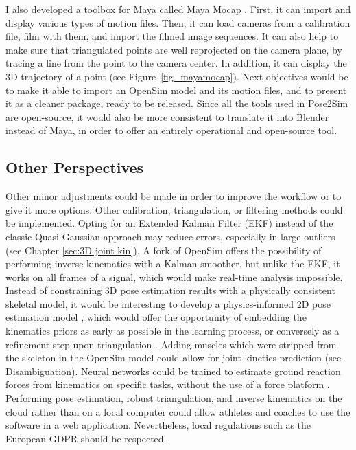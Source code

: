 I also developed a toolbox for Maya \cite{Maya1998} called Maya Mocap \cite{Pagnon2020}. First, it can import and display various types of motion files. Then, it can load cameras from a calibration file, film with them, and import the filmed image sequences. It can also help to make sure that triangulated points are well reprojected on the camera plane, by tracing a line from the point to the camera center. In addition, it can display the 3D trajectory of a point (see Figure~\ref{fig_mayamocap}). Next objectives would be to make it able to import an OpenSim model and its motion files, and to present it as a cleaner package, ready to be released. Since all the tools used in Pose2Sim are open-source, it would also be more consistent to translate it into Blender instead of Maya, in order to offer an entirely operational and open-source tool.


\FloatBarrier
\subsection{Other Perspectives}

Other minor adjustments could be made in order to improve the workflow or to give it more options. Other calibration, triangulation, or filtering methods could be implemented. Opting for an Extended Kalman Filter (EKF) instead of the classic Quasi-Gaussian approach \cite{Rauch1965,Needham2021a} may reduce errors, especially in large outliers (see Chapter \ref{sec:3D joint kin}). A fork of OpenSim offers the possibility of performing inverse kinematics with a Kalman smoother, but unlike the EKF, it works on all frames of a signal, which would make real-time analysis impossible. Instead of constraining 3D pose estimation results with a physically consistent skeletal model, it would be interesting to develop a physics-informed 2D pose estimation model \cite{Raissi2019,Xu2020a}, which would offer the opportunity of embedding the kinematics priors as early as possible in the learning process, or conversely as a refinement step upon triangulation \cite{Hua2022}. Adding muscles which were stripped from the skeleton in the OpenSim model could allow for joint kinetics prediction (see \hyperlink{Ann:gloss}{Disambiguation}). Neural networks could be trained to estimate ground reaction forces from kinematics on specific tasks, without the use of a force platform \cite{Oh2013,Johnson2018,Mundt2019}. Performing pose estimation, robust triangulation, and inverse kinematics on the cloud rather than on a local computer could allow athletes and coaches to use the software in a web application. Nevertheless, local regulations such as the European GDPR should be respected. 

